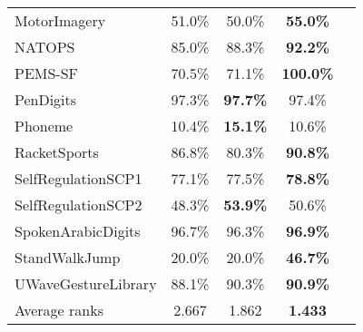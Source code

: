 \begin{tabular}{lcccc}
    MotorImagery              &  51.0\% &   50.0\% &              \textbf{55.0\%} \\
    NATOPS                    &  85.0\% &   88.3\% &              \textbf{92.2\%} \\
    PEMS-SF                   &  70.5\% &   71.1\% &             \textbf{100.0\%} \\
    PenDigits                 &  97.3\% &   \textbf{97.7\%} &              97.4\% \\
    Phoneme                   &  10.4\% &   \textbf{15.1\%} &              10.6\% \\
    RacketSports              &  86.8\% &   80.3\% &              \textbf{90.8\%} \\
    SelfRegulationSCP1        &  77.1\% &   77.5\% &              \textbf{78.8\%} \\
    SelfRegulationSCP2        &  48.3\% &   \textbf{53.9\%} &              50.6\% \\
    SpokenArabicDigits        &  96.7\% &   96.3\% &              \textbf{96.9\%} \\
    StandWalkJump             &  20.0\% &   20.0\% &              \textbf{46.7\%} \\
    UWaveGestureLibrary       &  88.1\% &   90.3\% &              \textbf{90.9\%} \\
    \midrule
    Average ranks             &  2.667  &   1.862 &       \textbf{1.433} \\
\bottomrule
\end{tabular}
